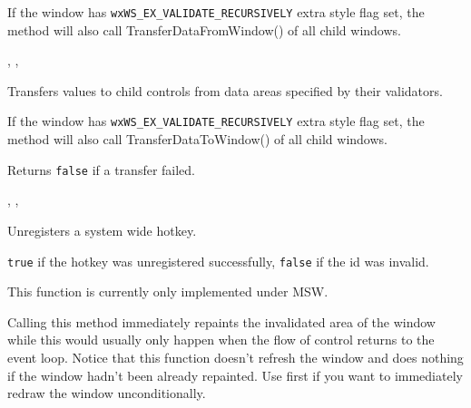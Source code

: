 If the window has {\tt wxWS\_EX\_VALIDATE\_RECURSIVELY} extra style flag set,
the method will also call TransferDataFromWindow() of all child windows.


,\rtfsp
{}, 


\label{wxwindowtransferdatatowindow}


Transfers values to child controls from data areas specified by their validators.

If the window has {\tt wxWS\_EX\_VALIDATE\_RECURSIVELY} extra style flag set,
the method will also call TransferDataToWindow() of all child windows.


Returns {\tt false} if a transfer failed.


,\rtfsp
{}, 


\label{wxwindowunregisterhotkey}


Unregisters a system wide hotkey.




{\tt true} if the hotkey was unregistered successfully, {\tt false} if the id was invalid.


This function is currently only implemented under MSW.




\label{wxwindowupdate}


Calling this method immediately repaints the invalidated area of the window
while this would usually only happen when the flow of control returns to the
event loop. Notice that this function doesn't refresh the window and does
nothing if the window hadn't been already repainted. Use
 first if you want to immediately redraw the
window unconditionally.


